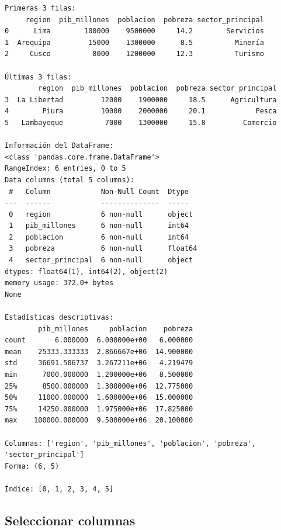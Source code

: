 \documentclass[
  doc,
  floatsintext,
  longtable,
  a4paper,
  nolmodern,
  notxfonts,
  notimes,
  12pt,
  colorlinks=true,linkcolor=blue,citecolor=blue,urlcolor=blue]{apa7}
\begin{document}
\begin{verbatim}
Primeras 3 filas:
     region  pib_millones  poblacion  pobreza sector_principal
0      Lima        100000    9500000     14.2        Servicios
1  Arequipa         15000    1300000      8.5          Minería
2     Cusco          8000    1200000     12.3          Turismo

Últimas 3 filas:
        region  pib_millones  poblacion  pobreza sector_principal
3  La Libertad         12000    1900000     18.5      Agricultura
4        Piura         10000    2000000     20.1            Pesca
5   Lambayeque          7000    1300000     15.8         Comercio

Información del DataFrame:
<class 'pandas.core.frame.DataFrame'>
RangeIndex: 6 entries, 0 to 5
Data columns (total 5 columns):
 #   Column            Non-Null Count  Dtype  
---  ------            --------------  -----  
 0   region            6 non-null      object 
 1   pib_millones      6 non-null      int64  
 2   poblacion         6 non-null      int64  
 3   pobreza           6 non-null      float64
 4   sector_principal  6 non-null      object 
dtypes: float64(1), int64(2), object(2)
memory usage: 372.0+ bytes
None

Estadísticas descriptivas:
        pib_millones     poblacion    pobreza
count       6.000000  6.000000e+00   6.000000
mean    25333.333333  2.866667e+06  14.900000
std     36691.506737  3.267211e+06   4.219479
min      7000.000000  1.200000e+06   8.500000
25%      8500.000000  1.300000e+06  12.775000
50%     11000.000000  1.600000e+06  15.000000
75%     14250.000000  1.975000e+06  17.825000
max    100000.000000  9.500000e+06  20.100000

Columnas: ['region', 'pib_millones', 'poblacion', 'pobreza', 'sector_principal']
Forma: (6, 5)

Índice: [0, 1, 2, 3, 4, 5]
\end{verbatim}

\subsection{Seleccionar columnas}\label{seleccionar-columnas}
\end{document}
